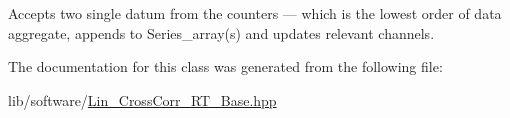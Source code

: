 Accepts two single {\ttfamily datum} from the counters — which is the lowest order of data aggregate, appends to Series\+\_\+array(s) and updates relevant channels. 



The documentation for this class was generated from the following file\+:\begin{DoxyCompactItemize}
\item 
lib/software/\hyperlink{Lin__CrossCorr__RT__Base_8hpp}{Lin\+\_\+\+Cross\+Corr\+\_\+\+R\+T\+\_\+\+Base.\+hpp}\end{DoxyCompactItemize}
